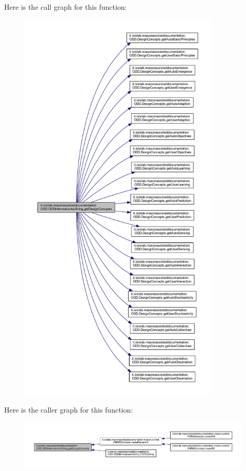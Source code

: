 Here is the call graph for this function\-:\nopagebreak
\begin{figure}[H]
\begin{center}
\leavevmode
\includegraphics[height=550pt]{classit_1_1isislab_1_1masonassisteddocumentation_1_1_o_d_d_1_1_o_d_d_information_as_string_a8ea3455b80112a986f25426327836b85_cgraph}
\end{center}
\end{figure}




Here is the caller graph for this function\-:\nopagebreak
\begin{figure}[H]
\begin{center}
\leavevmode
\includegraphics[width=350pt]{classit_1_1isislab_1_1masonassisteddocumentation_1_1_o_d_d_1_1_o_d_d_information_as_string_a8ea3455b80112a986f25426327836b85_icgraph}
\end{center}
\end{figure}


